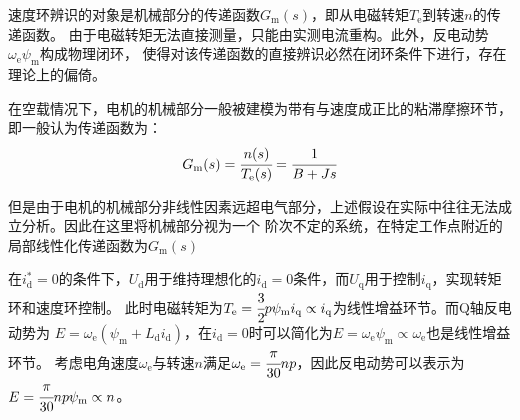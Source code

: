 速度环辨识的对象是机械部分的传递函数\(G_{\mathrm{m}}(s)\)，即从电磁转矩\(T_{\mathrm{e}}\)到转速\(n\)的传递函数。
由于电磁转矩无法直接测量，只能由实测电流重构。此外，反电动势\(\omega_{\mathrm{e}}\psi_{\mathrm{m}}\)构成物理闭环，
使得对该传递函数的直接辨识必然在闭环条件下进行，存在理论上的偏倚。

在空载情况下，电机的机械部分一般被建模为带有与速度成正比的粘滞摩擦环节，即一般认为传递函数为：
\begin{equation*}
    G_{\mathrm{m}}(s)=\cfrac{n(s)}{T_{\mathrm{e}}(s)}=\cfrac{1}{B+Js}
\end{equation*}

但是由于电机的机械部分非线性因素远超电气部分，上述假设在实际中往往无法成立分析。因此在这里将机械部分视为一个
阶次不定的系统，在特定工作点附近的局部线性化传递函数为\(G_{\mathrm{m}}(s)\)

在\(i_{\mathrm{d}}^*=0\)的条件下，\(U_{\mathrm{d}}\)用于维持理想化的\(i_{\mathrm{d}}=0\)条件，而\(U_{\mathrm{q}}\)用于控制\(i_{\mathrm{q}}\)，实现转矩环和速度环控制。
此时电磁转矩为\(T_{\mathrm{e}}=\cfrac{3}{2}p\psi_{\mathrm{m}}i_{\mathrm{q}}\propto i_{\mathrm{q}}\)为线性增益环节。而Q轴反电动势为
\(E=\omega_{\mathrm{e}}(\psi_{\mathrm{m}}+L_{\mathrm{d}}i_{\mathrm{d}})\)，在\(i_{\mathrm{d}}=0\)时可以简化为\(E=\omega_{\mathrm{e}}\psi_{\mathrm{m}}\propto \omega_{\mathrm{e}}\)也是线性增益环节。
考虑电角速度\(\omega_{\mathrm{e}}\)与转速\(n\)满足\(\omega_{\mathrm{e}}=\cfrac{\pi}{30}np\)，因此反电动势可以表示为
\(E=\cfrac{\pi}{30}np\psi_{\mathrm{m}}\propto n\)。

